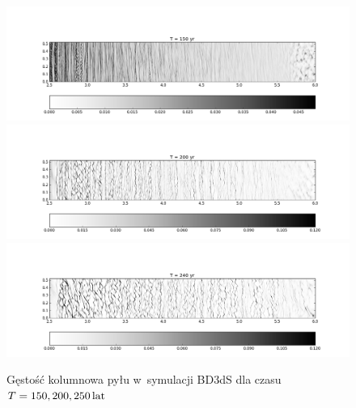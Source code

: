 \begin{figure}
   \centering
   \includegraphics[width=0.95\linewidth]{figures/proj1.png}\\
   \includegraphics[width=0.95\linewidth]{figures/proj2.png}\\
   \includegraphics[width=0.95\linewidth]{figures/proj3.png}
   \caption{Gęstość
      kolumnowa pyłu w~symulacji BD3dS dla czasu $T=150, 200, 250\hbox{$\thinspace\textrm{lat}$}$}
   \label{fig:projs}
\end{figure}
%
